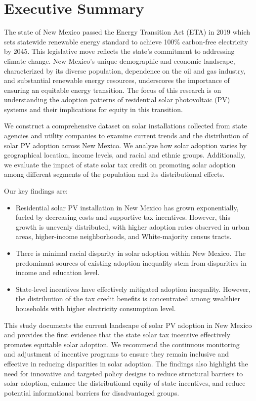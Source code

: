 \documentclass[11pt,twoside,letterpaper]{article}
\begin{document}
\onehalfspacing

\clearpage
\setcounter{page}{1}
\section*{Executive Summary}

The state of New Mexico passed the Energy Transition Act (ETA) in 2019 which sets statewide renewable energy standard to achieve 100\% carbon-free electricity by 2045. This legislative move reflects the state’s commitment to addressing climate change. New Mexico’s unique demographic and economic landscape, characterized by its diverse population, dependence on the oil and gas industry, and substantial renewable energy resources, underscores the importance of ensuring an equitable energy transition. The focus of this research is on understanding the adoption patterns of residential solar photovoltaic (PV) systems and their implications for equity in this transition.

We construct a comprehensive dataset on solar installations collected from state agencies and utility companies to examine current trends and the distribution of solar PV adoption across New Mexico. We analyze how solar adoption varies by geographical location, income levels, and racial and ethnic groups. Additionally, we evaluate the impact of state solar tax credit on promoting solar adoption among different segments of the population and its distributional effects.

Our key findings are:
\begin{itemize}
    \item Residential solar PV installation in New Mexico has grown exponentially, fueled by decreasing costs and supportive tax incentives. However, this growth is unevenly distributed, with higher adoption rates observed in urban areas, higher-income neighborhoods, and White-majority census tracts.
    \item There is minimal racial disparity in solar adoption within New Mexico. The predominant sources of existing adoption inequality stem from disparities in income and education level.
    \item State-level incentives have effectively mitigated adoption inequality. However, the distribution of the tax credit benefits is concentrated among wealthier households with higher electricity consumption level.
\end{itemize}

This study documents the current landscape of solar PV adoption in New Mexico and provides the first evidence that the state solar tax incentive effectively promotes equitable solar adoption. We recommend the continuous monitoring and adjustment of incentive programs to ensure they remain inclusive and effective in reducing disparities in solar adoption. The findings also highlight the need for innovative and targeted policy designs to reduce structural barriers to solar adoption, enhance the distributional equity of state incentives, and reduce potential informational barriers for disadvantaged groups.
\end{document}
